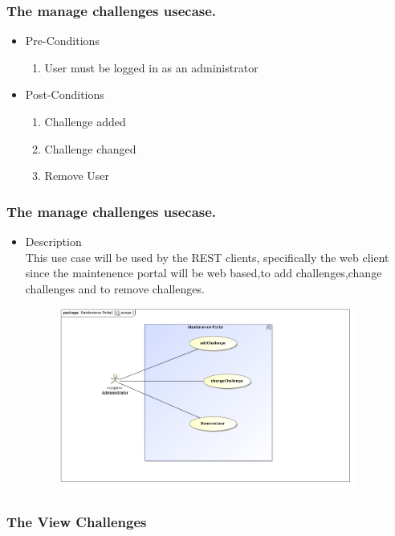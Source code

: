 \documentclass[english]{article}
\begin{document}
		
			\subsubsection{The manage challenges usecase.}
			
			\begin{itemize}
				
				
				\item Pre-Conditions
				\begin{enumerate}
					\item User must be logged in as an administrator
				\end{enumerate}
				\item Post-Conditions
				\begin{enumerate}
					\item Challenge added
					\item Challenge changed
					\item Remove User
					
				\end{enumerate}
				
				
			\end{itemize}	
			
			\subsubsection* {The manage challenges usecase.}
			\begin{itemize}
			   \item Description\\
				This use case will be used by the REST clients, specifically the web client since the maintenence portal will be web based,to add challenges,change       challenges and to remove challenges.
			\end{itemize}
			\includegraphics[width=14cm,height=6cm,keepaspectratio]{Challenge.jpg}	
		
		\subsubsection{The View Challenges}
		
\end{document}
